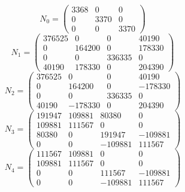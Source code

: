 \begingroup
\small
\allowdisplaybreaks
\begin{equation*}
N_{0}=\begin{pmatrix}
3368 & 0 & 0 \\
0 & 3370 & 0 \\
0 & 0 & 3370
\end{pmatrix}
\end{equation*}
\begin{equation*}
N_{1}=\begin{pmatrix}
376525 & 0 & 0 & 40190 \\
0 & 164200 & 0 & 178330 \\
0 & 0 & 336335 & 0 \\
40190 & 178330 & 0 & 204390
\end{pmatrix}
\end{equation*}
\begin{equation*}
N_{2}=\begin{pmatrix}
376525 & 0 & 0 & 40190 \\
0 & 164200 & 0 & -178330 \\
0 & 0 & 336335 & 0 \\
40190 & -178330 & 0 & 204390
\end{pmatrix}
\end{equation*}
\begin{equation*}
N_{3}=\begin{pmatrix}
191947 & 109881 & 80380 & 0 \\
109881 & 111567 & 0 & 0 \\
80380 & 0 & 191947 & -109881 \\
0 & 0 & -109881 & 111567
\end{pmatrix}
\end{equation*}
\begin{equation*}
N_{4}=\begin{pmatrix}
111567 & 109881 & 0 & 0 \\
109881 & 111567 & 0 & 0 \\
0 & 0 & 111567 & -109881 \\
0 & 0 & -109881 & 111567
\end{pmatrix}
\end{equation*}
